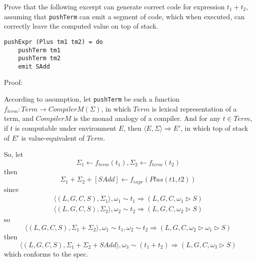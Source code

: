 \documentclass[]{article}
\numberwithin{equation}{section}
\numberwithin{figure}{section}
\numberwithin{table}{section}
\begin{document}
Prove that the following excerpt can generate correct code for expression
$t_1 + t_2$, assuming that \texttt{pushTerm} can emit a segment of code,
which when executed, can correctly leave the computed value on top of stack.

\begin{verbatim}
pushExpr (Plus tm1 tm2) = do
    pushTerm tm1
    pushTerm tm2
    emit SAdd
\end{verbatim}

Proof:

According to assumption, let \texttt{pushTerm} be such a function
$f_{term}: Term \rightarrow CompilerM(\Sigma)$, in which $Term$ is lexical
representation of a term, and $CompilerM$ is the monad analogy of a
compiler. And for any $t \in Term$, if $t$ is computable under
environment $E$, then $\langle E, \Sigma \rangle \Rightarrow E'$, in which top of stack
of $E'$ is value-equivalent of $Term$.

So, let $$\Sigma_1 \leftarrow f_{term}(t_1), \Sigma_2 \leftarrow f_{term}(t_2)$$
then $$ \Sigma_1 + \Sigma_2 + [SAdd] \leftarrow f_{expr}(Plus(t1, t2))$$
since
\begin{gather*}
  \langle (L, G, C, S), \Sigma_1\rangle, \omega_1 \sim t_1 \Rightarrow (L, G, C, \omega_1 \rhd S) \\
  \langle (L, G, C, S), \Sigma_2\rangle, \omega_2 \sim t_2 \Rightarrow (L, G, C, \omega_2 \rhd S)
\end{gather*}
so $$\langle (L, G, C, S), \Sigma_1 + \Sigma_2\rangle, \omega_1 \sim t_1, \omega_2 \sim t_2 \Rightarrow (L, G, C, \omega_2 \rhd \omega_1 \rhd S)$$
then $$\langle (L, G, C, S), \Sigma_1 + \Sigma_2 + SAdd\rangle, \omega_3 \sim (t_1 + t_2) \Rightarrow (L, G, C, \omega_3 \rhd S)$$
which conforms to the spec.
\end{document}
